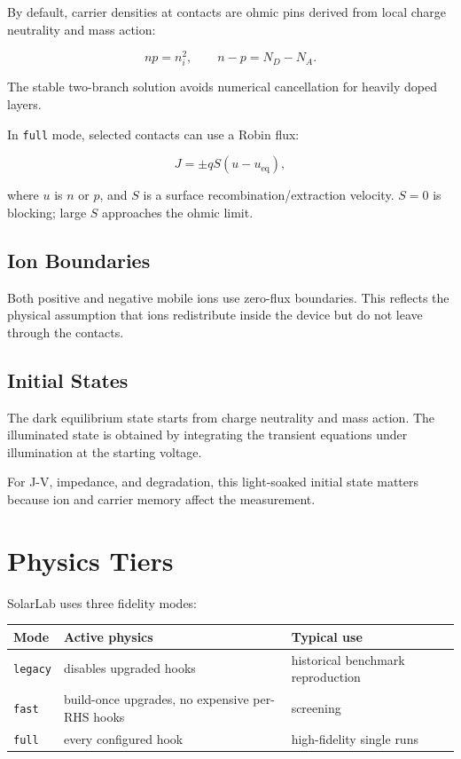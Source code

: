 \documentclass[
  11pt,
  american,
]{report}
\begin{document}
By default, carrier densities at contacts are ohmic pins derived from
local charge neutrality and mass action:

\[
np=n_i^2, \qquad n-p=N_D-N_A.
\]

The stable two-branch solution avoids numerical cancellation for heavily
doped layers.

In \texttt{full} mode, selected contacts can use a Robin flux:

\[
J=\pm qS(u-u_\mathrm{eq}),
\]

where \(u\) is \(n\) or \(p\), and \(S\) is a surface
recombination/extraction velocity. \(S=0\) is blocking; large \(S\)
approaches the ohmic limit.

\hypertarget{ion-boundaries}{%
\section{Ion Boundaries}\label{ion-boundaries}}

Both positive and negative mobile ions use zero-flux boundaries. This
reflects the physical assumption that ions redistribute inside the
device but do not leave through the contacts.

\hypertarget{initial-states}{%
\section{Initial States}\label{initial-states}}

The dark equilibrium state starts from charge neutrality and mass
action. The illuminated state is obtained by integrating the transient
equations under illumination at the starting voltage.

For J-V, impedance, and degradation, this light-soaked initial state
matters because ion and carrier memory affect the measurement.

\hypertarget{physics-tiers}{%
\chapter{Physics Tiers}\label{physics-tiers}}

SolarLab uses three fidelity modes:

\begin{longtable}[]{@{}lll@{}}
\toprule
Mode & Active physics & Typical use \\
\midrule
\endhead
\texttt{legacy} & disables upgraded hooks & historical benchmark
reproduction \\
\texttt{fast} & build-once upgrades, no expensive per-RHS hooks &
screening \\
\texttt{full} & every configured hook & high-fidelity single runs \\
\bottomrule
\end{longtable}
\end{document}
